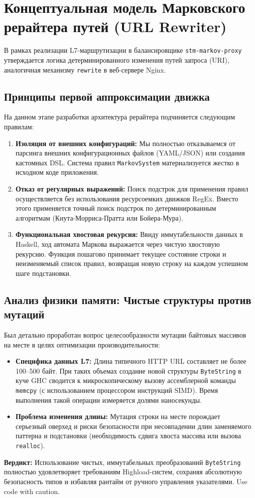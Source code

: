 \section{Концептуальная модель Марковского рерайтера путей (URL Rewriter)}

В рамках реализации L7-маршрутизации в балансировщике \texttt{stm-markov-proxy} утверждается логика детерминированного изменения путей запроса (URI), аналогичная механизму \texttt{rewrite} в веб-сервере Nginx.

\subsection{Принципы первой аппроксимации движка}
На данном этапе разработки архитектура рерайтера подчиняется следующим правилам:
\begin{enumerate}
    \item \textbf{Изоляция от внешних конфигураций:} Мы полностью отказываемся от парсинга внешних конфигурационных файлов (YAML/JSON) или создания кастомных DSL. Система правил \texttt{MarkovSystem} материализуется жестко в исходном коде приложения.
    \item \textbf{Отказ от регулярных выражений:} Поиск подстрок для применения правил осуществляется без использования ресурсоемких движков RegEx. Вместо этого применяется точный поиск подстрок по детерминированным алгоритмам (Кнута-Морриса-Пратта или Бойера-Мура).
    \item \textbf{Функциональная хвостовая рекурсия:} Ввиду иммутабельности данных в Haskell, ход автомата Маркова выражается через чистую хвостовую рекурсию. Функция пошагово принимает текущее состояние строки и неизменяемый список правил, возвращая новую строку на каждом успешном шаге подстановки.
\end{enumerate}

\subsection{Анализ физики памяти: Чистые структуры против мутаций}
Был детально проработан вопрос целесообразности мутации байтовых массивов на месте в целях оптимизации производительности:
\begin{itemize}
    \item \textbf{Специфика данных L7:} Длина типичного HTTP URL составляет не более 100–500 байт. При таких объемах создание новой структуры \texttt{ByteString} в куче GHC сводится к микроскопическому вызову ассемблерной команды \texttt{memcpy} (с использованием процессором инструкций SIMD). Время выполнения такой операции измеряется долями наносекунды.
    \item \textbf{Проблема изменения длины:} Мутация строки на месте порождает серьезный оверхед и риски безопасности при несовпадении длин заменяемого паттерна и подстановки (необходимость сдвига хвоста массива или вызова \texttt{realloc}). 
\end{itemize}
\textbf{Вердикт:} Использование чистых, иммутабельных преобразований \texttt{ByteString} полностью удовлетворяет требованиям Highload-систем, сохраняя абсолютную безопасность типов и избавляя рантайм от ручного управления указателями.
Use code with caution.
